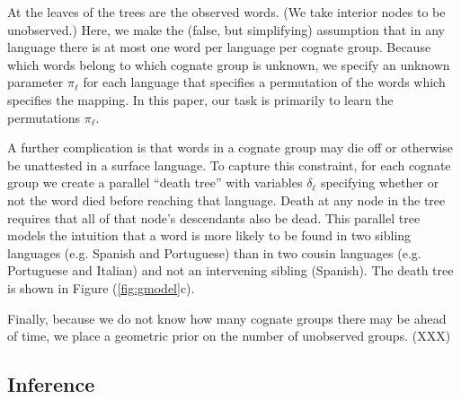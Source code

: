 \documentclass[11pt,a4paper]{article}
\begin{document}
At the leaves of the trees are the observed words. (We take interior
nodes to be unobserved.) Here, we make the (false, but simplifying)
assumption that in any language there is at most one word per
language per cognate group.  Because which words belong to which
cognate group is unknown, we specify an unknown parameter $\pi_\ell$
for each language that specifies a permutation of the words which
specifies the mapping. In this paper, our task is primarily to learn
the permutations $\pi_\ell$.

A further complication is that words in a cognate group may die off
or otherwise be unattested in a surface language. To capture this
constraint, for each cognate group we create a parallel ``death
tree'' with variables $\delta_\ell$ specifying whether or not the
word died before reaching that language. Death at any node in the
tree requires that all of that node's descendants also be dead.
This parallel tree models the intuition that a word is more likely
to be found in two sibling languages (e.g. Spanish and Portuguese)
than in two cousin languages (e.g. Portuguese and Italian) and not
an intervening sibling (Spanish).  The death tree is shown in Figure
(\ref{fig:gmodel}c).

Finally, because we do not know how many cognate groups there may
be ahead of time, we place a geometric prior on the number of
unobserved groups. (XXX)

\subsection{Inference}
\end{document}
